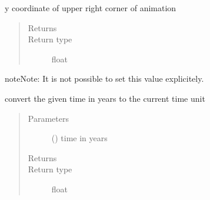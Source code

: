 \documentclass[letterpaper,10pt,english]{sphinxmanual}
\begin{document}
\begin{fulllineitems}
\begin{fulllineitems}
\end{fulllineitems}


\begin{fulllineitems}
\label{\detokenize{Reference:salabim.Environment.y1}}
y coordinate of upper right corner of animation
\begin{quote}\begin{description}
\item[{Returns}] \leavevmode
{}

\item[{Return type}] \leavevmode
float

\end{description}\end{quote}

\begin{sphinxadmonition}{note}{Note:}
It is not possible to set this value explicitely.
\end{sphinxadmonition}

\end{fulllineitems}


\begin{fulllineitems}
\label{\detokenize{Reference:salabim.Environment.years}}
convert the given time in years to the current time unit
\begin{quote}\begin{description}
\item[{Parameters}] \leavevmode
{} () \textendash{} time in years

\item[{Returns}] \leavevmode
{}

\item[{Return type}] \leavevmode
float

\end{description}\end{quote}

\end{fulllineitems}


\end{fulllineitems}
\end{document}
